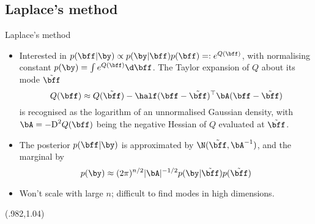 \subsection{Laplace's method}
\begin{frame}[label=laplace]{Laplace's method}
  \vspace{-15pt}
  \begin{itemize}[<+->]\setlength\itemsep{0.8em}
    \item Interested in $p(\bff|\by) \propto p(\by|\bff)p(\bff) =: e^{Q(\bff)}$, with normalising constant $p(\by) = \int e^{Q(\bff)} \d\bff$. The Taylor expansion of $Q$ about its mode $\tilde\bff$
    \[
      Q(\bff) \approx Q(\tilde\bff) - \half (\bff - \tilde\bff)^\top\bA(\bff - \tilde\bff) 
    \]
    is recognised as the logarithm of an unnormalised Gaussian density, with $\bA = -\text{D}^2 Q(\bff)$ being the negative Hessian of $Q$ evaluated at  $\tilde\bff$.
    \item The posterior $p(\bff|\by)$ is approximated by $\N(\tilde\bff, \bA^{-1})$, and the marginal by
    \[
      p(\by) \approx (2\pi)^{n/2} \vert \bA \vert^{-1/2}  p(\by|\tilde\bff)p(\tilde\bff)
    \]
    \item Won't scale with large $n$; difficult to find modes in high dimensions.
  \end{itemize}
  
  \begin{textblock*}{3cm}(.982\textwidth,1.04\textheight)%
    \hyperlink{estimation}{}      
  \end{textblock*}
\end{frame}
